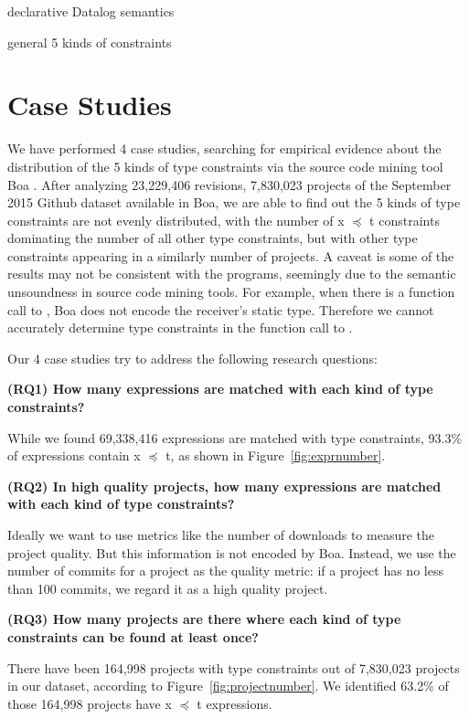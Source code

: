  declarative Datalog semantics

general 5 kinds of constraints

\section{Case Studies}
\label{chp:case}

 We have performed 4 case studies, searching for empirical evidence about the distribution of the 5 kinds of type constraints via the source code mining tool Boa \cite{Dyer-Nguyen-Rajan-Nguyen-13}. After analyzing 23,229,406 revisions, 7,830,023 projects of the September 2015 Github dataset available in Boa, we are able to find out the 5 kinds of type constraints are not evenly distributed, with the number of x $\preceq$ t constraints dominating the number of all other type constraints, but with other type constraints appearing in a similarly number of projects.  A caveat is some of the results may not be consistent with the programs, seemingly due to the semantic unsoundness in source code mining tools. For example, when there is a function call to , Boa does not encode the receiver's static type. Therefore we cannot accurately determine type constraints in the function call to .  

Our 4 case studies try to address the following research questions:

\textbf{(RQ1) How many expressions are matched with each kind of type constraints?}

While we found 69,338,416 expressions are matched with type constraints, 93.3\% of expressions contain x $\preceq$ t, as shown in Figure~\ref{fig:exprnumber}.

\textbf{(RQ2) In high quality projects, how many expressions are matched with each kind of type constraints?}

Ideally we want to use metrics like the number of downloads to measure the project quality.  But this information is not encoded by Boa.  Instead, we use the number of commits for a project as the quality metric: if a project has no less than 100 commits, we regard it as a high quality project. 

\textbf{(RQ3) How many projects are there where each kind of type constraints can be found at least once?}

There have been 164,998 projects with type constraints out of 7,830,023 projects in our dataset, according to Figure~\ref{fig:projectnumber}. We identified 63.2\% of those 164,998 projects have x $\preceq$ t expressions.  

